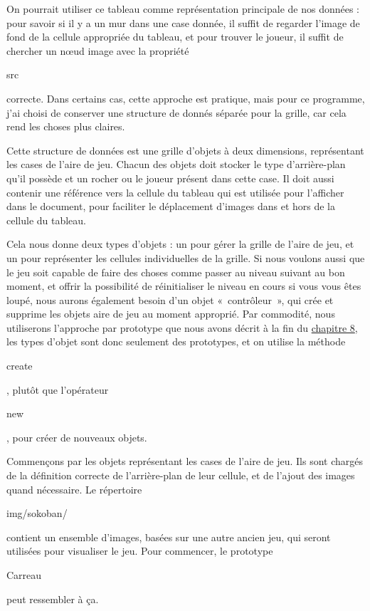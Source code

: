 \documentclass{FramateX}
\renewcommand{\texttt}[1]{\begin{sffamily}{#1}\end{sffamily}}
\begin{document}
On pourrait utiliser ce tableau comme représentation principale de nos
données : pour savoir si il y a un mur dans une case donnée, il suffit
de regarder l'image de fond de la cellule appropriée du tableau, et pour
trouver le joueur, il suffit de chercher un nœud image avec la propriété
\texttt{src} correcte. Dans certains cas, cette approche est pratique,
mais pour ce programme, j'ai choisi de conserver une structure de donnés
séparée pour la grille, car cela rend les choses plus claires.

Cette structure de données est une grille d'objets à deux dimensions,
représentant les cases de l'aire de jeu. Chacun des objets doit stocker
le type d'arrière-plan qu'il possède et un rocher ou le joueur présent
dans cette case. Il doit aussi contenir une référence vers la cellule du
tableau qui est utilisée pour l'afficher dans le document, pour
faciliter le déplacement d'images dans et hors de la cellule du tableau.

Cela nous donne deux types d'objets : un pour gérer la grille de l'aire
de jeu, et un pour représenter les cellules individuelles de la grille.
Si nous voulons aussi que le jeu soit capable de faire des choses comme
passer au niveau suivant au bon moment, et offrir la possibilité de
réinitialiser le niveau en cours si vous vous êtes loupé, nous aurons
également besoin d'un objet «~contrôleur~», qui crée et supprime les
objets aire de jeu au moment approprié. Par commodité, nous utiliserons
l'approche par prototype que nous avons décrit à la fin du
\href{chapter8.html}{chapitre 8}, les types d'objet sont donc seulement
des prototypes, et on utilise la méthode \texttt{create}, plutôt que
l'opérateur \texttt{new}, pour créer de nouveaux objets.

\begin{center}\end{center}

Commençons par les objets représentant les cases de l'aire de jeu. Ils
sont chargés de la définition correcte de l'arrière-plan de leur
cellule, et de l'ajout des images quand nécessaire. Le répertoire
\texttt{img/sokoban/} contient un ensemble d'images, basées sur une
autre ancien jeu, qui seront utilisées pour visualiser le jeu. Pour
commencer, le prototype \texttt{Carreau} peut ressembler à ça.
\end{document}
